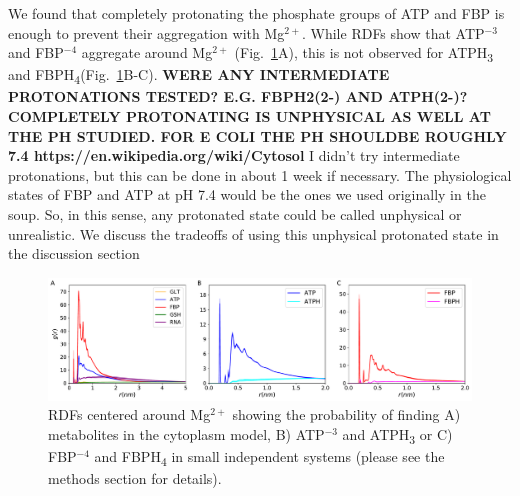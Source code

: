 \documentclass[journal=jcisd8,manuscript=article]{achemso}
\begin{document}
We found that completely protonating the phosphate groups of ATP and
FBP is enough to prevent their aggregation with Mg$^{2+}$. While RDFs
show that ATP$^{-3}$ and FBP$^{-4}$ aggregate around Mg$^{2+}$
(Fig.~\ref{fig:avoiding_aggregation}A), this is not observed for
ATPH\textsubscript{3} and
FBPH\textsubscript{4}(Fig.~\ref{fig:avoiding_aggregation}B-C).  {\bf
  WERE ANY INTERMEDIATE PROTONATIONS TESTED? E.G. FBPH2(2-) AND ATPH(2-)?
  COMPLETELY PROTONATING IS UNPHYSICAL AS WELL AT THE PH STUDIED. FOR E COLI THE PH SHOULDBE ROUGHLY 7.4 https://en.wikipedia.org/wiki/Cytosol} {\color{blue}I didn't try intermediate protonations, but this can be done in about 1 week if necessary. The physiological states of FBP and ATP at pH 7.4 would be the ones we used originally in the soup. So, in this sense, any protonated state could be called unphysical or unrealistic. We discuss the tradeoffs of using this unphysical protonated state in the discussion section}

\begin{figure}[H]
\hspace*{-2cm}\includegraphics[scale=0.5]{rdf_mg.pdf}
\caption{RDFs centered around Mg$^{2+}$ showing the probability of
  finding A) metabolites in the cytoplasm model, B) ATP$^{-3}$ and
  ATPH\textsubscript{3} or C) FBP$^{-4}$ and FBPH\textsubscript{4} in
  small independent systems (please see the methods section for
  details).}
\label{fig:avoiding_aggregation}
\end{figure}


 
\end{document}
